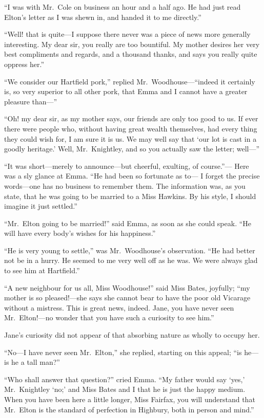``I was with Mr.\ Cole on business an hour and a half ago.
He had just read Elton's letter as I was shewn in, and handed it
to me directly.''

``Well! that is quite---I suppose there never was a piece of news more
generally interesting.  My dear sir, you really are too bountiful.
My mother desires her very best compliments and regards, and a
thousand thanks, and says you really quite oppress her.''

``We consider our Hartfield pork,'' replied Mr.\ Woodhouse---``indeed it
certainly is, so very superior to all other pork, that Emma and I
cannot have a greater pleasure than---''

``Oh! my dear sir, as my mother says, our friends are only too good
to us.  If ever there were people who, without having great wealth
themselves, had every thing they could wish for, I am sure it is us.
We may well say that `our lot is cast in a goodly heritage.'
Well, Mr.\ Knightley, and so you actually saw the letter; well---''

``It was short---merely to announce---but cheerful, exulting, of course.''---%
Here was a sly glance at Emma.  ``He had been so fortunate as to---%
I forget the precise words---one has no business to remember them.
The information was, as you state, that he was going to be married
to a Miss Hawkins.  By his style, I should imagine it just settled.''

``Mr.\ Elton going to be married!'' said Emma, as soon as she could speak.
``He will have every body's wishes for his happiness.''

``He is very young to settle,'' was Mr.\ Woodhouse's observation.
``He had better not be in a hurry.  He seemed to me very well off
as he was.  We were always glad to see him at Hartfield.''

``A new neighbour for us all, Miss Woodhouse!'' said Miss Bates,
joyfully; ``my mother is so pleased!---she says she cannot
bear to have the poor old Vicarage without a mistress.
This is great news, indeed.  Jane, you have never seen
Mr.\ Elton!---no wonder that you have such a curiosity to see him.''

Jane's curiosity did not appear of that absorbing nature as wholly
to occupy her.

``No---I have never seen Mr.\ Elton,'' she replied, starting on this appeal;
``is he---is he a tall man?''

``Who shall answer that question?'' cried Emma.  ``My father would
say `yes,' Mr.\ Knightley `no;' and Miss Bates and I that he is
just the happy medium.  When you have been here a little longer,
Miss Fairfax, you will understand that Mr.\ Elton is the standard
of perfection in Highbury, both in person and mind.''

